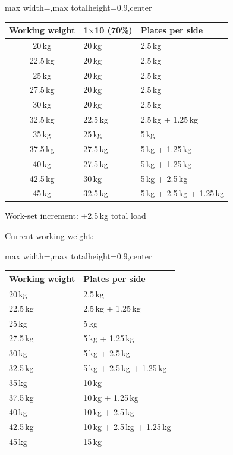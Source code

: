 \documentclass[11pt,a4paper]{article}
\newcommand{\tablearraystretch}{1.15}
\begin{document}
\begin{center}
\renewcommand{\arraystretch}{\tablearraystretch}
\begin{adjustbox}{max width=\linewidth,max totalheight=0.9\textheight,center}
\begin{tabular}{cll}
\toprule
Working weight & 1$\times$10 (70\%) & Plates per side \\
\midrule
20\,kg   & 20\,kg   & 2.5\,kg \\
22.5\,kg & 20\,kg   & 2.5\,kg \\
25\,kg   & 20\,kg   & 2.5\,kg \\
27.5\,kg & 20\,kg   & 2.5\,kg \\
30\,kg   & 20\,kg   & 2.5\,kg \\
32.5\,kg & 22.5\,kg & 2.5\,kg + 1.25\,kg \\
35\,kg   & 25\,kg   & 5\,kg \\
37.5\,kg & 27.5\,kg & 5\,kg + 1.25\,kg \\
40\,kg   & 27.5\,kg & 5\,kg + 1.25\,kg \\
42.5\,kg & 30\,kg   & 5\,kg + 2.5\,kg \\
45\,kg   & 32.5\,kg & 5\,kg + 2.5\,kg + 1.25\,kg \\
\bottomrule
\end{tabular}
\end{adjustbox}
\renewcommand{\arraystretch}{1}
\end{center}

Work-set increment: +2.5\,kg total load

Current working weight:

\begin{center}
\renewcommand{\arraystretch}{\tablearraystretch}
\begin{adjustbox}{max width=\linewidth,max totalheight=0.9\textheight,center}
\begin{tabular}{ll}
\toprule
Working weight & Plates per side \\
\midrule
20\,kg & 2.5\,kg \\
22.5\,kg & 2.5\,kg + 1.25\,kg \\
25\,kg & 5\,kg \\
27.5\,kg & 5\,kg + 1.25\,kg \\
30\,kg & 5\,kg + 2.5\,kg \\
32.5\,kg & 5\,kg + 2.5\,kg + 1.25\,kg \\
35\,kg & 10\,kg \\
37.5\,kg & 10\,kg + 1.25\,kg \\
40\,kg & 10\,kg + 2.5\,kg \\
42.5\,kg & 10\,kg + 2.5\,kg + 1.25\,kg \\
45\,kg & 15\,kg \\
\bottomrule
\end{tabular}
\end{adjustbox}
\renewcommand{\arraystretch}{1}
\end{center}
\end{document}
